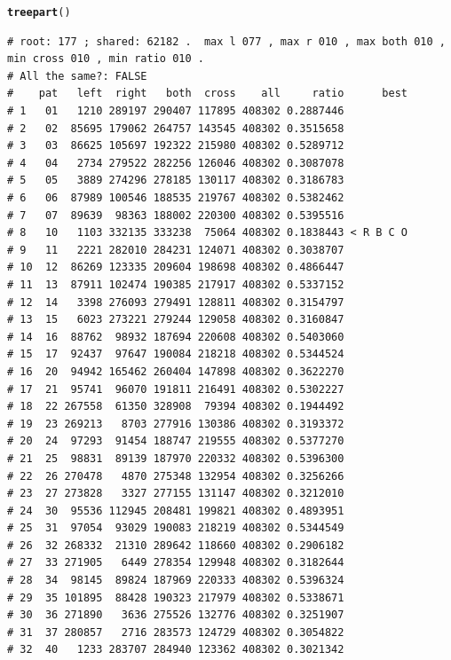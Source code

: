 \documentclass{article}\usepackage[]{graphicx}\usepackage[]{color}
\makeatletter
\newcommand{\hlstd}[1]{\textcolor[rgb]{0.345,0.345,0.345}{#1}}%
\newcommand{\hlkwd}[1]{\textcolor[rgb]{0.737,0.353,0.396}{\textbf{#1}}}%
\newenvironment{kframe}{%
 \def\at@end@of@kframe{}%
 \ifinner\ifhmode%
  \def\at@end@of@kframe{\end{minipage}}%
  \begin{minipage}{\columnwidth}%
 \fi\fi%
 \def\FrameCommand##1{\hskip\@totalleftmargin \hskip-\fboxsep
 \colorbox{shadecolor}{##1}\hskip-\fboxsep
     \hskip-\linewidth \hskip-\@totalleftmargin \hskip\columnwidth}%
 \MakeFramed {\advance\hsize-\width
   \@totalleftmargin\z@ \linewidth\hsize
   \@setminipage}}%
 {\par\unskip\endMakeFramed%
 \at@end@of@kframe}
\newenvironment{knitrout}{}{} %
\makeatother
\begin{document}
\begin{knitrout}\footnotesize
{}\color{fgcolor}\begin{kframe}
\begin{alltt}
\hlkwd{treepart}\hlstd{()}
\end{alltt}
\begin{verbatim}
# root: 177 ; shared: 62182 .  max l 077 , max r 010 , max both 010 , min cross 010 , min ratio 010 . 
# All the same?: FALSE
#    pat   left  right   both  cross    all     ratio      best
# 1   01   1210 289197 290407 117895 408302 0.2887446          
# 2   02  85695 179062 264757 143545 408302 0.3515658          
# 3   03  86625 105697 192322 215980 408302 0.5289712          
# 4   04   2734 279522 282256 126046 408302 0.3087078          
# 5   05   3889 274296 278185 130117 408302 0.3186783          
# 6   06  87989 100546 188535 219767 408302 0.5382462          
# 7   07  89639  98363 188002 220300 408302 0.5395516          
# 8   10   1103 332135 333238  75064 408302 0.1838443 < R B C O
# 9   11   2221 282010 284231 124071 408302 0.3038707          
# 10  12  86269 123335 209604 198698 408302 0.4866447          
# 11  13  87911 102474 190385 217917 408302 0.5337152          
# 12  14   3398 276093 279491 128811 408302 0.3154797          
# 13  15   6023 273221 279244 129058 408302 0.3160847          
# 14  16  88762  98932 187694 220608 408302 0.5403060          
# 15  17  92437  97647 190084 218218 408302 0.5344524          
# 16  20  94942 165462 260404 147898 408302 0.3622270          
# 17  21  95741  96070 191811 216491 408302 0.5302227          
# 18  22 267558  61350 328908  79394 408302 0.1944492          
# 19  23 269213   8703 277916 130386 408302 0.3193372          
# 20  24  97293  91454 188747 219555 408302 0.5377270          
# 21  25  98831  89139 187970 220332 408302 0.5396300          
# 22  26 270478   4870 275348 132954 408302 0.3256266          
# 23  27 273828   3327 277155 131147 408302 0.3212010          
# 24  30  95536 112945 208481 199821 408302 0.4893951          
# 25  31  97054  93029 190083 218219 408302 0.5344549          
# 26  32 268332  21310 289642 118660 408302 0.2906182          
# 27  33 271905   6449 278354 129948 408302 0.3182644          
# 28  34  98145  89824 187969 220333 408302 0.5396324          
# 29  35 101895  88428 190323 217979 408302 0.5338671          
# 30  36 271890   3636 275526 132776 408302 0.3251907          
# 31  37 280857   2716 283573 124729 408302 0.3054822          
# 32  40   1233 283707 284940 123362 408302 0.3021342          

\end{verbatim}
\end{kframe}
\end{knitrout}
\end{document}
